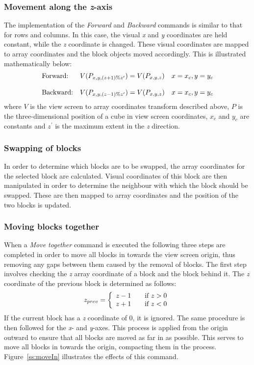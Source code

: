 \subsubsection{Movement along the \emph{z}-axis}
The implementation of the \emph{Forward} and \emph{Backward} commands is similar to that for rows and columns. In this case, the visual \emph{x} and \emph{y} coordinates are held constant, while the \emph{z} coordinate is changed. These visual coordinates are mapped to array coordinates and the block objects moved accordingly. This is illustrated mathematically below:
\begin{displaymath}
	\begin{array}{l l l}
		\mbox{Forward:} & V(P_{x, y, (z+1) \% z^{\prime}})  = V(P_{x, y, z}) & x = x_c, y = y_c \\
		& & \\
		\mbox{Backward:} & V(P_{x, y, (z-1) \% z^{\prime}})  = V(P_{x, y, z}) & x = x_c, y = y_c \\
	\end{array}
\end{displaymath}
where $V$ is the view screen to array coordinates transform described above, $P$ is the three-dimensional position of a cube in view screen coordinates, $x_c$ and $y_c$ are constants and $z^{\prime}$ is the maximum extent in the \emph{z} direction.

\subsubsection{Swapping of blocks}
In order to determine which blocks are to be swapped, the array coordinates for the selected block are calculated. Visual coordinates of this block are then manipulated in order to determine the neighbour with which the block should be swapped. These are then mapped to array coordinates and the position of the two blocks is updated.

\subsubsection{Moving blocks together}
When a \emph{Move together} command is executed the following three steps are completed in order to move all blocks in towards the view screen origin, thus removing any gaps between them caused by the removal of blocks. The first step involves checking the \emph{z} array coordinate of a block and the block behind it. The \emph{z} coordinate of the previous block is determined as follows:
\[z_{prev} = \left\{ 
\begin{array}{l l}
  z - 1 & \quad \mbox{if }z > 0 \\
  z + 1 & \quad \mbox{if }z < 0 \\ 
\end{array} \right. \]
If the current block has a \emph{z} coordinate of 0, it is ignored. The same procedure is then followed for the \emph{x}- and \emph{y}-axes. This process is applied from the origin outward to ensure that all blocks are moved as far in as possible. This serves to move all blocks in towards the origin, compacting them in the process. Figure~\ref{ss:moveIn} illustrates the effects of this command.


